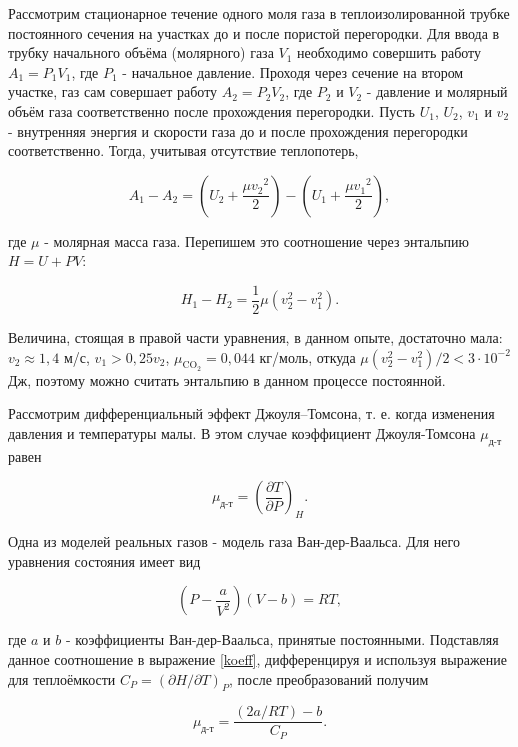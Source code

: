 \documentclass[a4paper,12pt]{article} %
\begin{document}
Рассмотрим стационарное течение одного моля газа в теплоизолированной трубке постоянного сечения на участках до и после пористой перегородки. Для ввода в трубку начального объёма (молярного) газа $V_1$ необходимо совершить работу $A_1 = P_1 V_1$, где $P_1$ - начальное давление. Проходя через сечение на втором участке, газ сам совершает работу $A_2 = P_2 V_2$, где $P_2$ и $V_2$ - давление и молярный объём газа соответственно после прохождения перегородки. Пусть $U_1$, $U_2$, $v_1$ и $v_2$ - внутренняя энергия и скорости газа до и после прохождения перегородки соответственно. Тогда, учитывая отсутствие теплопотерь,

\begin{equation}
    A_1 - A_2 = (U_2 + \frac{\mu {v_2}^2}{2}) - (U_1 + \frac{\mu {v_1}^2}{2}),
\end{equation}

где $\mu$ - молярная масса газа. Перепишем это соотношение через энтальпию $H = U + PV$:

\begin{equation}
    H_1 - H_2 = \frac{1}{2}\mu(v_2^2 - v_1^2).
\end{equation}

Величина, стоящая в правой части уравнения, в данном опыте, достаточно мала: $v_2 \approx 1,4$ м/с, $v_1 > 0,25v_2$, $\mu_{\text{CO}_2} = 0,044$ кг/моль, откуда $\mu(v_2^2 - v_1^2)/2 < 3 \cdot 10^{-2}$ Дж, поэтому можно считать энтальпию в данном процессе постоянной. 

Рассмотрим дифференциальный эффект Джоуля–Томсона, т. е. когда изменения давления и температуры малы. В этом случае коэффициент Джоуля-Томсона $\mu_\text{д-т}$ равен

\begin{equation}
    \mu_\text{д-т} = (\frac{\partial T}{\partial P})_H.
    \label{koeff}
\end{equation}

Одна из моделей реальных газов - модель газа Ван-дер-Ваальса. Для него уравнения состояния имеет вид

\begin{equation}
    (P - \frac{a}{V^2})(V - b) = RT,
    \label{vdv}
\end{equation}

где $a$ и $b$ - коэффициенты Ван-дер-Ваальса, принятые постоянными. Подставляя данное соотношение в выражение \eqref{koeff}, дифференцируя и используя выражение для теплоёмкости $C_P = (\partial H/\partial T)_P$, после преобразований получим

\begin{equation}
    \mu_\text{д-т} = \frac{(2a/RT) - b}{C_P}.
    \label{mainEq}
\end{equation}
\end{document}
